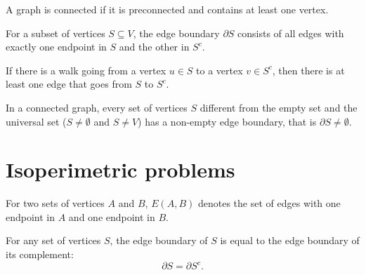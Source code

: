 \begin{definition}[Connected]
\label{def:Connected}
\leanok
A graph is connected if it is preconnected and contains at least one vertex.
\end{definition}

\begin{definition}
\label{def:edgeBoundary}
\leanok
For a subset of vertices $S \subseteq V$, the edge boundary $\partial S$ consists of all edges with exactly one endpoint in $S$ and the other in $S^c$.
\end{definition}

\begin{lemma}
\label{lem:walk_crossing}
If there is a walk going from a vertex $u \in S$ to a vertex $v \in S^c$, then there is at least one edge that goes from $S$ to $S^c$.
\end{lemma}

\begin{lemma}
\label{lem:connected_non_empty_edge_boundary}
\leanok
In a connected graph, every set of vertices $S$ different from the empty set and the universal set ($S \neq \emptyset$ and $S \neq V$) has a non-empty edge boundary, that is $\partial S \neq \emptyset$.
\end{lemma}








\chapter{Isoperimetric problems}


\begin{definition}
\label{def:edgeConnection}
\leanok
For two sets of vertices $A$ and $B$, $E(A, B)$ denotes the set of edges with one endpoint in $A$ and one endpoint in $B$.
\end{definition}

\begin{lemma}
\label{lem:edgeBoundaryComplement}
\leanok
For any set of vertices $S$, the edge boundary of $S$ is equal to the edge boundary of its complement:
$$
\partial S = \partial S^c.
$$
\end{lemma}

